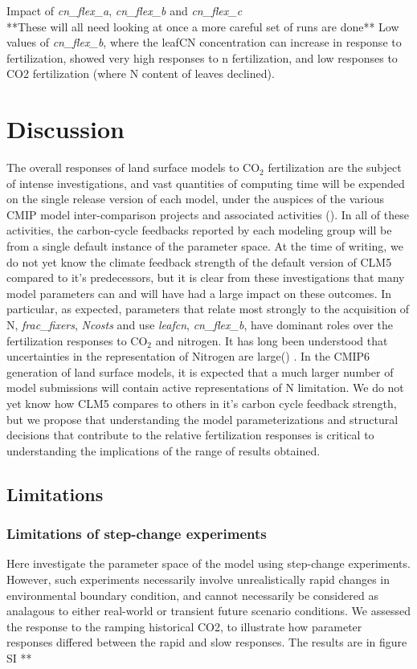 \documentclass[draft,linenumbers]{agujournal}
\begin{document}
Impact of \emph{cn\_flex\_a},  \emph{cn\_flex\_b} and \emph{cn\_flex\_c}\\
**These will all need looking at once a more careful set of runs are done**
Low values of \emph{cn\_flex\_b}, where the leafCN concentration can increase in response to fertilization, showed very high responses to n fertilization, and low responses to CO2 fertilization (where N content of leaves declined). 


\section{Discussion}
The overall responses of land surface models to CO$_{2}$ fertilization are the subject of intense investigations, and vast quantities of computing time will be expended on the single release version of each model, under the auspices of the various CMIP model inter-comparison projects and associated activities  (\cite{meehl2014}).  In all of these activities, the carbon-cycle feedbacks reported by each modeling group will be from a single default instance of the parameter space.  At the time of writing, we do not yet know the climate feedback strength of the default version of CLM5 compared to it's predecessors, but it is clear from these investigations that many model parameters can and will have had a large impact on these outcomes.  In particular, as expected, parameters that relate most strongly to the acquisition of N, \emph{frac\_fixers}, \emph{Ncosts} and use \emph{leafcn}, \emph{cn\_flex\_b}, have dominant roles over the fertilization responses to CO$_{2}$ and nitrogen.  It has long been understood that uncertainties in the representation of Nitrogen are large(\cite{zaehle2014}) . In the CMIP6 generation of land surface models, it is expected that a much larger number of model submissions will contain active representations of N limitation. We do not yet know how CLM5 compares to others in it's carbon cycle feedback strength, but we propose that understanding the model parameterizations and structural decisions that contribute to the relative fertilization responses is critical to understanding the implications of the range of results obtained. 

\subsection{Limitations}
\subsubsection{Limitations of step-change experiments}
Here investigate the parameter space of the model using step-change experiments. However, such experiments necessarily involve unrealistically rapid changes in environmental boundary condition, and cannot necessarily be considered as analagous to either real-world or transient future scenario conditions. We assessed the response to the ramping historical CO2, to illustrate how parameter responses differed between the rapid and slow responses. The results are in figure SI **
\end{document}
